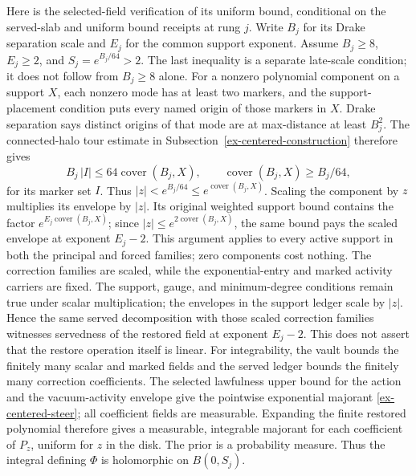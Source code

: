 Here is the selected-field verification of its uniform bound, conditional on
the served-slab and uniform bound receipts at rung $j$. Write $B_j$ for its
Drake separation scale and $E_j$ for the common support exponent. Assume
$B_j\geq8$, $E_j\geq2$, and $S_j=e^{B_j/64}>2$. The last inequality is a
separate late-scale condition; it does not follow from $B_j\geq8$ alone.
For a nonzero polynomial component on a support $X$, each nonzero mode has at
least two markers, and the support-placement condition puts every named
origin of those markers in $X$. Drake separation says distinct origins of
that mode are at max-distance at least $B_j^2$.
The connected-halo tour estimate in Subsection~\ref{ex-centered-construction}
therefore gives
\[
 B_j\,|I|\leq64\operatorname{cover}(B_j,X),
 \qquad \operatorname{cover}(B_j,X)\geq B_j/64,
\]
for its marker set $I$. Thus $|z|<e^{B_j/64}\leq
e^{\operatorname{cover}(B_j,X)}$. Scaling the component by $z$ multiplies
its envelope by $|z|$. Its original weighted support bound contains the
factor $e^{E_j\operatorname{cover}(B_j,X)}$; since
$|z|\leq e^{2\operatorname{cover}(B_j,X)}$, the same bound pays the scaled
envelope at exponent $E_j-2$. This argument applies to every active support
in both the principal and forced families; zero components cost nothing.
The correction families are scaled, while the exponential-entry and marked
activity carriers are fixed. The support, gauge, and minimum-degree
conditions remain true under scalar multiplication; the envelopes in the
support ledger scale by $|z|$. Hence the same served decomposition with those
scaled correction families witnesses servedness of the restored field at
exponent $E_j-2$. This does not assert that the restore operation itself is
linear. For integrability, the vault bounds the finitely many scalar and
marked fields and the served ledger bounds the finitely many correction
coefficients. The selected lawfulness upper bound for the action and the
vacuum-activity envelope give the pointwise exponential majorant
\eqref{ex-centered-steer}; all coefficient fields are measurable.
Expanding the finite restored polynomial therefore gives a measurable,
integrable majorant for each coefficient of $P_z$, uniform for $z$ in the
disk. The prior is a probability measure. Thus the integral defining $\Phi$
is holomorphic on $B(0,S_j)$.

